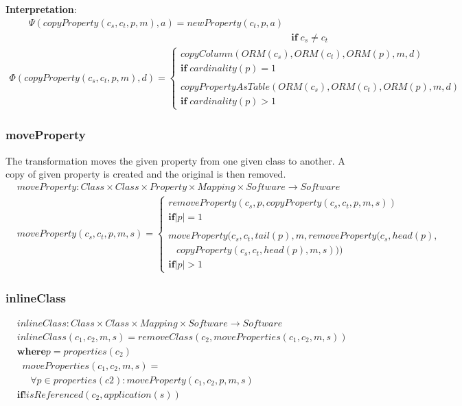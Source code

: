 \documentclass[10pt]{article}
\begin{document}
\noindent \textbf{Interpretation}:
\begin{align}
\Psi(copyProperty(c_s, c_t, p, m), a) = newProperty(c_t, p, a)  \nonumber \\
& \mathbf{if} \; c_s \neq c_t
\end{align}
\begin{align}
\Phi(copyProperty(c_s, c_t, p, m), d) = \begin{cases}
 copyColumn(ORM(c_s), ORM(c_t), ORM(p), m, d) \\
 \mathbf{if} \; cardinality(p) = 1  \\\\
 copyPropertyAsTable(ORM(c_s), ORM(c_t), ORM(p), m, d) \\ 
 \mathbf{if} \; cardinality(p) > 1
 \end{cases}
\end{align}

\subsubsection{moveProperty}
The transformation moves the given property from one given class to another. A copy of given property is created and the original is then removed.
\begin{align}
& moveProperty: Class \times Class \times Property \times Mapping \times Software \rightarrow Software \\
& moveProperty(c_s, c_t, p, m, s) = \begin{cases}
removeProperty(c_s, p, copyProperty(c_s, c_t, p, m, s)) \\
\mathbf{if} |p| = 1 \\\\
moveProperty(c_s, c_t, tail(p), m, removeProperty(c_s, head(p), \\ \;\;\; copyProperty(c_s, c_t, head(p), m, s))) \\ 
\mathbf{if} |p| > 1
 \end{cases}
\end{align}

\subsubsection{inlineClass}
\begin{align}
& inlineClass:  Class \times Class \times Mapping \times Software \rightarrow Software \\
& inlineClass(c_1, c_2, m, s) = removeClass(c_2, moveProperties(c_1, c_2, m, s)) \\
& \mathbf{where} p =  properties(c_2) \nonumber \\ 
& \;\; moveProperties(c_1, c_2, m, s) = \nonumber \\
& \;\; \;\;\; \forall p \in properties(c2) : moveProperty(c_1, c_2, p, m, s) \nonumber \\
& \mathbf{if} !isReferenced(c_2, application(s))
\end{align}
\end{document}
